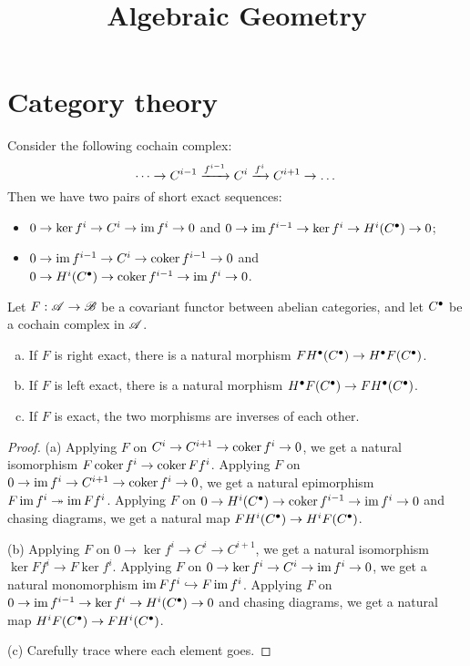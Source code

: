 \documentclass[11pt]{amsart}
\title{Algebraic Geometry}
\author{}
\begin{document}
\maketitle

\tableofcontents

\newpage

\section{Category theory}

\begin{lem}
Consider the following cochain complex:
\[\dots \to C^{i-1}\xrightarrow{f^{i-1}} C^i \xrightarrow{f^i} C^{i+1} \to \dots\]
Then we have two pairs of short exact sequences:
\begin{itemize}
    \item $0 \to \ker f^i \to C^i \to \operatorname{im} f^i \to 0$ and $0 \to \operatorname{im} f^{i-1} \to \ker f^i \to H^i(C^{\bullet}) \to 0$;
    \item $0 \to \operatorname{im} f^{i-1} \to C^i \to \operatorname{coker} f^{i-1} \to 0$ and $0 \to H^i(C^{\bullet}) \to \operatorname{coker} f^{i-1} \to \operatorname{im} f^i \to 0$.
\end{itemize}
\end{lem}

\begin{prop}
Let $F: \mathscr{A} \to \mathscr{B}$ be a covariant functor between abelian categories, and let $C^{\bullet}$ be a cochain complex in $\mathscr{A}$.
\begin{enumerate}[(a)]
    \item If $F$ is right exact, there is a natural morphism $FH^{\bullet}(C^{\bullet}) \to H^{\bullet}F(C^{\bullet})$.
    \item If $F$ is left exact, there is a natural morphism $H^{\bullet}F(C^{\bullet}) \to FH^{\bullet}(C^{\bullet})$.
    \item If $F$ is exact, the two morphisms are inverses of each other.
\end{enumerate}
\end{prop}

\begin{proof}
(a) Applying $F$ on $C^i \to C^{i+1} \to \operatorname{coker} f^i \to 0$, we get a natural isomorphism $F\operatorname{coker} f^i \to \operatorname{coker} Ff^i$. Applying $F$ on $0 \to \operatorname{im} f^{i} \to C^{i+1} \to \operatorname{coker} f^i \to 0$, we get a natural epimorphism $F\operatorname{im} f^i \twoheadrightarrow \operatorname{im} Ff^i$. Applying $F$ on $0 \to H^i(C^{\bullet}) \to \operatorname{coker} f^{i-1} \to \operatorname{im} f^i \to 0$ and chasing diagrams, we get a natural map $FH^i(C^{\bullet}) \to H^i F(C^{\bullet})$.

(b) Applying $F$ on $0 \to \ker f^i \to C^i \to C^{i+1}$, we get a natural isomorphism $\ker Ff^i \to F\ker f^i$. Applying $F$ on $0 \to \ker f^i \to C^i \to \operatorname{im} f^i \to 0$, we get a natural monomorphism $\operatorname{im} F f^i \hookrightarrow F\operatorname{im} f^i$. Applying $F$ on $0 \to \operatorname{im} f^{i-1} \to \ker f^i \to H^i(C^{\bullet}) \to 0$ and chasing diagrams, we get a natural map $H^iF(C^{\bullet}) \to F H^i(C^{\bullet})$.

(c) Carefully trace where each element goes.
\end{proof}
\end{document}
